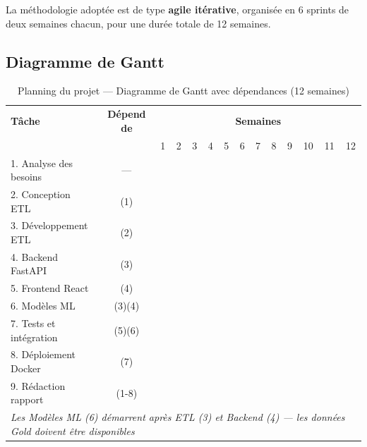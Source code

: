 \documentclass[12pt,a4paper]{report}
\begin{document}
	La méthodologie adoptée est de type \textbf{agile itérative}, organisée en 6 sprints
	de deux semaines chacun, pour une durée totale de 12 semaines.
	
	\subsection{Diagramme de Gantt}
	
	\begin{table}[H]
		\centering
		\caption{Planning du projet — Diagramme de Gantt avec dépendances (12 semaines)}
		\renewcommand{\arraystretch}{1.15}
		\small
		\begin{tabular}{l|c|cccccccccccc}
			\toprule
			\textbf{Tâche} & \textbf{Dépend de} & \multicolumn{12}{c}{\textbf{Semaines}} \\
			& & 1 & 2 & 3 & 4 & 5 & 6 & 7 & 8 & 9 & 10 & 11 & 12 \\
			\midrule
			1. Analyse des besoins   & —     & \cellcolor{bleuLight!60} & \cellcolor{bleuLight!60} & & & & & & & & & & \\
			2. Conception ETL        & (1)   & & \cellcolor{orange!50} & \cellcolor{orange!50} & & & & & & & & & \\
			3. Développement ETL     & (2)   & & & \cellcolor{orange!80} & \cellcolor{orange!80} & & & & & & & & \\
			4. Backend FastAPI       & (3)   & & & & \cellcolor{vertOK!60} & \cellcolor{vertOK!60} & \cellcolor{vertOK!60} & & & & & & \\
			5. Frontend React        & (4)   & & & & & \cellcolor{violet!40} & \cellcolor{violet!40} & \cellcolor{violet!40} & \cellcolor{violet!40} & & & & \\
			6. Modèles ML            & (3)(4)& & & & & & & \cellcolor{rouge!40} & \cellcolor{rouge!40} & \cellcolor{rouge!40} & & & \\
			7. Tests et intégration  & (5)(6)& & & & & & & & & \cellcolor{jaune!60} & \cellcolor{jaune!60} & & \\
			8. Déploiement Docker    & (7)   & & & & & & & & & & \cellcolor{bleuMain!40} & \cellcolor{bleuMain!40} & \\
			9. Rédaction rapport     & (1-8) & & & & & & & & & & & \cellcolor{grisLight!60} & \cellcolor{grisLight!60} \\
			\bottomrule
			\multicolumn{14}{l}{\textit{Les Modèles ML (6) démarrent après ETL (3) et Backend (4) — les données Gold doivent être disponibles}} \\
		\end{tabular}
	\end{table}
	
\end{document}
